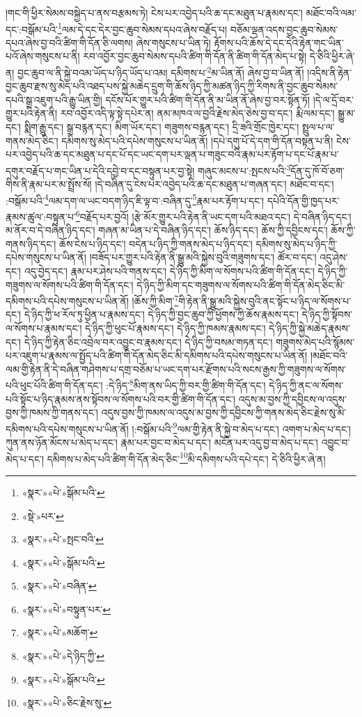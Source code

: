 །གང་གི་ཕྱིར་སེམས་བསྐྱེད་པ་ནས་བརྩམས་ཏེ། ངེས་པར་འབྱེད་པའི་ཆ་དང་མཐུན་པ་རྣམས་དང་། མཐོང་བའི་ལམ་དང་:བསྒོམ་པའི་\footnote{«སྣར་»«པེ་»སྒོམ་པའི་}ལམ་དེ་དང་དེར་བྱང་ཆུབ་སེམས་དཔའ་ཞེས་བརྗོད་པ། བཅོམ་ལྡན་འདས་བྱང་ཆུབ་སེམས་དཔའ་ཞེས་བྱ་བའི་ཚིག་གི་དོན་ཅི་ལགས། ཞེས་གསུངས་པ་ཡིན་ཏེ། རྟོགས་པའི་ཆོས་དེ་དང་དེའི་རྟེན་གང་ཡིན་པའོ་ཞེས་གསུངས་པ་ནི། རབ་འབྱོར་བྱང་ཆུབ་སེམས་དཔའི་ཚིག་གི་དོན་ནི་ཚིག་གི་དོན་མེད་པ་སྟེ། དེ་ཅིའི་ཕྱིར་ཞེ་ན། བྱང་ཆུབ་ལ་ནི་སྐྱེ་བའམ་ཡོད་པ་ཉིད་ཡོད་པ་འམ། དམིགས་པ་\footnote{«སྡེ་»པར་}མ་ཡིན་ནོ། ཞེས་བྱ་བ་ཡིན་ནོ། །འདིས་ནི་རྟེན་བྱང་ཆུབ་རྫས་སུ་མེད་པའི་འཐད་པས་སྐྱེ་མཆེད་དྲུག་གི་ཆོས་ཉིད་ཀྱི་མཚན་ཉིད་ཀྱི་རིགས་ནི་བྱང་ཆུབ་སེམས་དཔའི་སྒྲ་འཇུག་པའི་རྒྱུ་ཡིན་གྱི། དངོས་པོར་གྱུར་པའི་ཚིག་གི་དོན་ནི་མ་ཡིན་ནོ་ཞེས་བྱ་བར་སྟོན་ཏོ། །དེ་ལ་དྲོ་བར་གྱུར་པའི་རྟེན་ནི། རབ་འབྱོར་འདི་ལྟ་སྟེ་དཔེར་ན། ནམ་མཁའ་ལ་བྱའི་རྗེས་མེད་ཅེས་བྱ་བ་དང་། རྨི་ལམ་དང་། སྒྱུ་མ་དང་། སྨིག་རྒྱུ་དང་། སྒྲ་བརྙན་དང་། མིག་ཡོར་དང་། གཟུགས་བརྙན་དང་། དྲི་ཟའི་གྲོང་ཁྱེར་དང་། སྤྲུལ་པ་ལ་གནས་མེད་ཅིང་། དམིགས་སུ་མེད་པའི་དཔེས་གསུངས་པ་ཡིན་ནོ། །དཔེ་དགུ་པོ་དེ་དག་གི་དོན་བསྟན་པ་ནི། ངེས་པར་འབྱེད་པའི་ཆ་དང་མཐུན་པ་དང་པོ་དང་ཡང་དག་པར་ལྡན་པ་གཟུང་བའི་རྣམ་པར་རྟོག་པ་དང་པོ་རྣམ་པ་དགུར་བརྗོད་པ་གང་ཡིན་པ་དེའི་དབྱེ་བ་དང་བསྟུན་པར་བྱ་སྟེ། གཞུང་མངས་པ་:སྤངས་པའི་\footnote{«སྣར་»«པེ་»སྤང་བའི་}དོན་དུ་ཁོ་བོ་ཅག་གིས་ནི་རྣམ་པར་མ་སྤྲོས་སོ། །དེ་བཞིན་དུ་ངེས་པར་འབྱེད་པའི་ཆ་དང་མཐུན་པ་གཞན་དང་། མཐོང་བ་དང་། :བསྒོམ་པའི་\footnote{«སྣར་»«པེ་»སྒོམ་པའི་}ལམ་དག་ལ་ཡང་བདག་ཉིད་ཇི་ལྟ་བ་:བཞིན་དུ་\footnote{«སྣར་»«པེ་»བཞིན་}རྣམ་པར་རྟོག་པ་དང་། དཔེའི་དོན་གྱི་ཁྱད་པར་རྣམས་ཚུལ་:བསྟུན་པ་\footnote{«སྣར་»«པེ་»བསྟུན་པར་}བརྗོད་པར་བྱའོ། །རྩེ་མོར་གྱུར་པའི་རྟེན་ནི་ཡང་དག་པའི་མཐའ་དང་། དེ་བཞིན་ཉིད་དང་། མ་ནོར་བ་དེ་བཞིན་ཉིད་དང་། གཞན་མ་ཡིན་པ་དེ་བཞིན་ཉིད་དང་། ཆོས་ཉིད་དང་། ཆོས་ཀྱི་དབྱིངས་དང་། ཆོས་ཀྱི་གནས་ཉིད་དང་། ཆོས་ངེས་པ་ཉིད་དང་། བདེན་པ་ཉིད་ཀྱི་གནས་མེད་པ་ཉིད་དང་། དམིགས་སུ་མེད་པ་ཉིད་ཀྱི་དཔེས་གསུངས་པ་ཡིན་ནོ། །བཟོད་པར་གྱུར་པའི་རྟེན་ནི་སྒྱུ་མའི་སྐྱེས་བུའི་གཟུགས་དང་། ཚོར་བ་དང་། འདུ་ཤེས་དང་། འདུ་བྱེད་དང་། རྣམ་པར་ཤེས་པའི་གནས་དང་། དེ་ཉིད་ཀྱི་མིག་ལ་སོགས་པའི་ཚིག་གི་དོན་དང་། དེ་ཉིད་ཀྱི་གཟུགས་ལ་སོགས་པའི་ཚིག་གི་དོན་དང་། དེ་ཉིད་ཀྱི་མིག་དང་གཟུགས་ལ་སོགས་པའི་ཚིག་གི་དོན་མེད་ཅིང་མི་དམིགས་པའི་དཔེས་གསུངས་པ་ཡིན་ནོ། །ཆོས་ཀྱི་མིག་\footnote{«སྣར་»«པེ་»མཆོག་}གི་རྟེན་ནི་སྒྱུ་མའི་སྐྱེས་བུའི་ནང་སྟོང་པ་ཉིད་ལ་སོགས་པ་དང་། དེ་ཉིད་ཀྱི་ཕ་རོལ་ཏུ་ཕྱིན་པ་རྣམས་དང་། དེ་ཉིད་ཀྱི་བྱང་ཆུབ་ཀྱི་ཕྱོགས་ཀྱི་ཆོས་རྣམས་དང་། དེ་ཉིད་ཀྱི་སྟོབས་ལ་སོགས་པ་རྣམས་དང་། དེ་ཉིད་ཀྱི་ཕུང་པོ་རྣམས་དང་། དེ་ཉིད་ཀྱི་ཁམས་རྣམས་དང་། དེ་ཉིད་ཀྱི་སྐྱེ་མཆེད་རྣམས་དང་། དེ་ཉིད་ཀྱི་རྟེན་ཅིང་འབྲེལ་བར་འབྱུང་བ་རྣམས་དང་། དེ་ཉིད་ཀྱི་བསམ་གཏན་དང་། གཟུགས་མེད་པའི་སྙོམས་པར་འཇུག་པ་རྣམས་ལ་སྤྱོད་པའི་ཚིག་གི་དོན་མེད་ཅིང་མི་དམིགས་པའི་དཔེས་གསུངས་པ་ཡིན་ནོ། །མཐོང་བའི་ལམ་གྱི་རྟེན་ནི་དེ་བཞིན་གཤེགས་པ་དགྲ་བཅོམ་པ་ཡང་དག་པར་རྫོགས་པའི་སངས་རྒྱས་ཀྱི་གཟུགས་ལ་སོགས་པའི་ཕུང་པོའི་ཚིག་གི་དོན་དང་། :དེ་ཉིད་\footnote{«སྣར་»«པེ་»དེ་ཉིད་ཀྱི་}མིག་ནས་ཡིད་ཀྱི་བར་གྱི་ཚིག་གི་དོན་དང་། དེ་ཉིད་ཀྱི་ནང་ལ་སོགས་པའི་སྟོང་པ་ཉིད་རྣམས་ནས་སྟོབས་ལ་སོགས་པའི་བར་གྱི་ཚིག་གི་དོན་དང་། འདུས་མ་བྱས་ཀྱི་དབྱིངས་ལ་འདུས་བྱས་ཀྱི་ཁམས་ཀྱི་གནས་དང་། འདུས་བྱས་ཀྱི་ཁམས་ལ་འདུས་མ་བྱས་ཀྱི་དབྱིངས་ཀྱི་གནས་མེད་ཅིང་རྗེས་སུ་མི་དམིགས་པའི་དཔེས་གསུངས་པ་ཡིན་ནོ། །:བསྒོམ་པའི་\footnote{«སྣར་»«པེ་»སྒོམ་པའི་}ལམ་གྱི་རྟེན་ནི་སྐྱེ་བ་མེད་པ་དང་། འགག་པ་མེད་པ་དང་། ཀུན་ནས་ཉོན་མོངས་པ་མེད་པ་དང་། རྣམ་པར་བྱང་བ་མེད་པ་དང་། མངོན་པར་འདུ་བྱ་བ་མེད་པ་དང་། འབྱུང་བ་མེད་པ་དང་། དམིགས་པ་མེད་པའི་ཚིག་གི་དོན་མེད་ཅིང་\footnote{«སྣར་»«པེ་»ཅིང་རྗེས་སུ་}མི་དམིགས་པའི་དཔེ་དང་། དེ་ཅིའི་ཕྱིར་ཞེ་ན། 